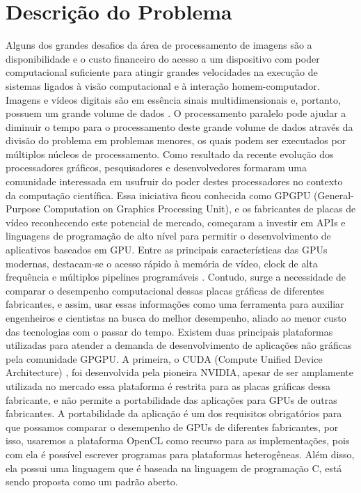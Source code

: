 \section{Descrição do Problema}
Alguns dos grandes desafios da área de processamento de imagens são a disponibilidade e o custo financeiro do acesso a um dispositivo com poder computacional suficiente para atingir grandes velocidades na execução de sistemas ligados à visão computacional e à interação homem-computador. Imagens e vídeos digitais são em essência sinais multidimensionais e, portanto, possuem um grande volume de dados \cite{khali}. 
O processamento paralelo pode ajudar a diminuir o tempo para o processamento deste grande volume de dados através da divisão do problema em problemas menores, os quais podem ser executados por múltiplos núcleos de processamento.
Como resultado da recente evolução dos processadores gráficos, pesquisadores e desenvolvedores formaram uma comunidade interessada em usufruir do poder destes processadores no contexto da computação científica. Essa iniciativa ficou conhecida como GPGPU (General-Purpose Computation on Graphics Processing  Unit), e os fabricantes de placas de vídeo reconhecendo este potencial de mercado, começaram a investir em APIs e linguagens de programação de alto nível para permitir o desenvolvimento de aplicativos baseados em GPU. Entre as principais características das GPUs modernas, destacam-se o acesso rápido à memória de vídeo, clock de alta frequência e múltiplos pipelines programáveis \cite{tamakashi}.
Contudo, surge a necessidade de comparar o desempenho computacional dessas placas gráficas de diferentes fabricantes, e assim, usar essas informações como uma ferramenta para auxiliar engenheiros e cientistas na busca do melhor desempenho, aliado ao menor custo das tecnologias com o passar do tempo.
Existem duas principais plataformas utilizadas para atender a demanda de desenvolvimento de aplicações não gráficas pela comunidade GPGPU. A primeira, o CUDA (Compute Unified Device Architecture) \cite{nvidia}, foi desenvolvida pela pioneira NVIDIA, apesar de ser amplamente utilizada no mercado essa plataforma é restrita para as placas gráficas dessa fabricante, e não permite a portabilidade das aplicações para GPUs de outras fabricantes.
A portabilidade da aplicação é um dos requisitos obrigatórios para que possamos comparar o desempenho de GPUs de diferentes fabricantes, por isso, usaremos a plataforma OpenCL \cite{kronos}  como recurso para as implementações, pois com ela é possível escrever programas para plataformas heterogêneas. Além disso, ela possui uma linguagem que é baseada na linguagem de programação C, está sendo proposta como um  padrão aberto.

